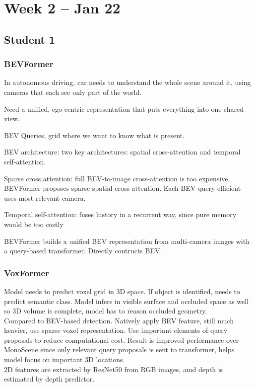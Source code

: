 \section{Week 2 -- Jan 22}

\subsection{Student 1}
\subsubsection{BEVFormer}
In autonomous driving, car needs to understand the whole scene around it, using cameras that each see only part of the world.

Need a unified, ego-centric representation that puts everything into one shared view.

BEV Queries, grid where we want to know what is present.

BEV architecture: two key architectures: spatial cross-attention and temporal self-attention.

Sparse cross attention: full BEV-to-image cross-attention is too expensive. BEVFormer proposes sparse spatial cross-attention. Each BEV query efficient uses most relevant camera.

Temporal self-attention: fuses history in a recurrent way, since pure memory would be too costly

BEVFormer builds a unified BEV representation from multi-camera images with a query-based transformer. Directly contructs BEV.

\subsubsection{VoxFormer}
Model needs to predict voxel grid in 3D space. If object is identified, needs to predict semantic class. Model infers in visible surface and occluded space as well so 3D volume is complete, model has to reason occluded geometry. \\

Compared to BEV-based detection. Natively apply BEV feature, still much heavier, use sparse voxel representation. Use important elements of query proposals to reduce computational cost. Result is improved performance over MonoScene since only relevant query proposals is sent to transformer, helps model focus on important 3D locations. \\

2D features are extracted by ResNet50 from RGB images, amd depth is estimated by depth predictor. \\

